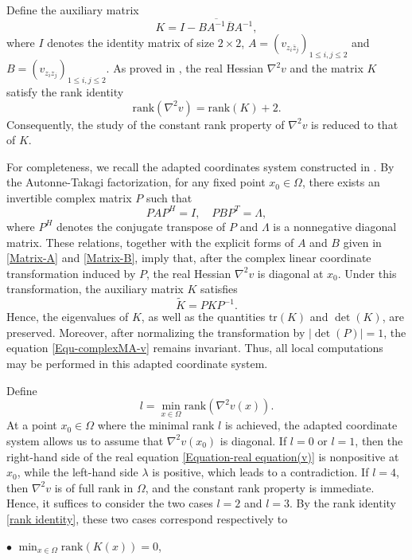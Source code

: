 \documentclass[11pt]{amsart}
\numberwithin{theorem}{section}
\numberwithin{equation}{section}
\begin{document}
Define the auxiliary matrix
\begin{equation}\label{Auxiliary matrix K}
K=I-B\overline{A^{-1}}\overline{B}A^{-1},
\end{equation}
where $I$ denotes the identity matrix of size $2\times 2$, $A=(v_{z_i\bar{z}_j})_{1\leq i,j\leq 2}$ and $B=(v_{z_iz_j})_{1\leq i,j\leq 2}$. As proved in \cite{Zhang-Zhou2025}, the real Hessian $\nabla^2v$ and the matrix $K$ satisfy the rank identity
\begin{equation}\label{rank identity}
\mathrm{rank}(\nabla^2v)=\mathrm{rank}(K)+2.
\end{equation}
Consequently, the study of the constant rank property of $\nabla^2v$ is reduced to that of $K$.

For completeness, we recall the adapted coordinates system constructed in \cite{Zhang-Zhou2025}. By the Autonne-Takagi factorization, for any fixed point $x_0\in\Omega$, there exists an invertible complex matrix $P$ such that $$PAP^H=I,\quad PBP^T=\Lambda,$$ where $P^H$ denotes the conjugate transpose of $P$ and $\Lambda$ is a nonnegative diagonal matrix. These relations, together with the explicit forms of $A$ and $B$ given in \eqref{Matrix-A} and \eqref{Matrix-B}, imply that, after the complex linear coordinate transformation induced by $P$, the real Hessian $\nabla^2v$ is diagonal at $x_0$. Under this transformation, the auxiliary matrix $K$ satisfies $$\widetilde{K}=PKP^{-1}.$$ Hence, the eigenvalues of $K$, as well as the quantities $\mathrm{tr}(K)$ and $\det(K)$, are preserved. Moreover, after normalizing the transformation by $|\det(P)|=1$, the equation \eqref{Equ-complexMA-v} remains invariant. Thus, all local computations may be performed in this adapted coordinate system.

Define $$l=\min_{x\in\Omega}\mathrm{rank}(\nabla^2v(x)).$$
At a point $x_0\in\Omega$ where the minimal rank $l$ is achieved, the adapted coordinate system allows us to assume that $\nabla^2v(x_0)$ is diagonal. If $l=0$ or $l=1$, then the right-hand side of the real equation \eqref{Equation-real equation(v)} is nonpositive at $x_0$, while the left-hand side $\lambda$ is positive, which leads to a contradiction. If $l=4$, then $\nabla^2v$ is of full rank in $\Omega$, and the constant rank property is immediate. Hence, it suffices to consider the two cases $l=2$ and $l=3$. By the rank identity \eqref{rank identity}, these two cases correspond respectively to

$\bullet$ $\min_{x\in\Omega}\mathrm{rank}(K(x))=0$,
\end{document}
